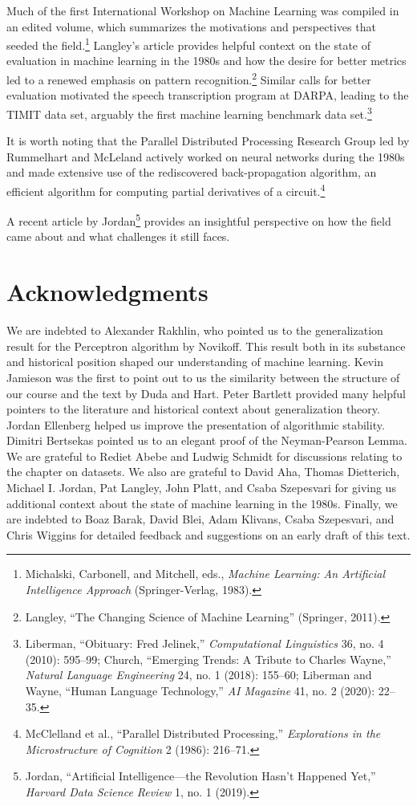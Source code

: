 \documentclass{tufte-book}
\begin{document}
Much of the first International Workshop on Machine Learning was
compiled in an edited volume, which summarizes the motivations and
perspectives that seeded the field.\footnote{Michalski, Carbonell, and
  Mitchell, eds., \emph{Machine Learning: An Artificial Intelligence
  Approach} (Springer-Verlag, 1983).} Langley's article provides helpful
context on the state of evaluation in machine learning in the 1980s and
how the desire for better metrics led to a renewed emphasis on pattern
recognition.\footnote{Langley, {``The Changing Science of Machine
  Learning''} (Springer, 2011).} Similar calls for better evaluation
motivated the speech transcription program at DARPA, leading to the
TIMIT data set, arguably the first machine learning benchmark data
set.\footnote{Liberman, {``Obituary: {F}red {J}elinek,''}
  \emph{Computational Linguistics} 36, no. 4 (2010): 595--99; Church,
  {``Emerging Trends: A Tribute to Charles Wayne,''} \emph{Natural
  Language Engineering} 24, no. 1 (2018): 155--60; Liberman and Wayne,
  {``Human Language Technology,''} \emph{{AI} Magazine} 41, no. 2
  (2020): 22--35.}

It is worth noting that the Parallel Distributed Processing Research
Group led by Rummelhart and McLeland actively worked on neural networks
during the 1980s and made extensive use of the rediscovered
back-propagation algorithm, an efficient algorithm for computing partial
derivatives of a circuit.\footnote{McClelland et al., {``Parallel
  Distributed Processing,''} \emph{Explorations in the Microstructure of
  Cognition} 2 (1986): 216--71.}

A recent article by Jordan\footnote{Jordan, {``Artificial
  Intelligence---the Revolution Hasn't Happened Yet,''} \emph{Harvard
  Data Science Review} 1, no. 1 (2019).} provides an insightful
perspective on how the field came about and what challenges it still
faces.

\hypertarget{acknowledgments}{%
\section{Acknowledgments}\label{acknowledgments}}

We are indebted to Alexander Rakhlin, who pointed us to the
generalization result for the Perceptron algorithm by Novikoff. This
result both in its substance and historical position shaped our
understanding of machine learning. Kevin Jamieson was the first to point
out to us the similarity between the structure of our course and the
text by Duda and Hart. Peter Bartlett provided many helpful pointers to
the literature and historical context about generalization theory.
Jordan Ellenberg helped us improve the presentation of algorithmic
stability. Dimitri Bertsekas pointed us to an elegant proof of the
Neyman-Pearson Lemma. We are grateful to Rediet Abebe and Ludwig Schmidt
for discussions relating to the chapter on datasets. We also are
grateful to David Aha, Thomas Dietterich, Michael I. Jordan, Pat
Langley, John Platt, and Csaba Szepesvari for giving us additional
context about the state of machine learning in the 1980s. Finally, we
are indebted to Boaz Barak, David Blei, Adam Klivans, Csaba Szepesvari,
and Chris Wiggins for detailed feedback and suggestions on an early
draft of this text.
\end{document}
